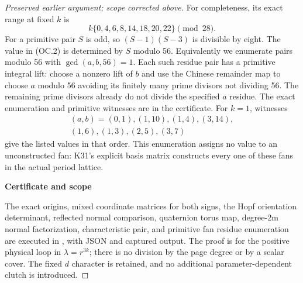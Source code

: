 \begin{proof}[Preserved earlier argument; scope corrected above]
For completeness, its exact range at fixed \(k\) is
\[
       k\{0,4,6,8,14,18,20,22\}\pmod {28}.
 \tag{OC.25}
\]
For a primitive pair \(S\) is odd, so \((S-1)(S-3)\) is divisible by eight.
The value in (OC.2) is determined by \(S\) modulo 56. Equivalently we
enumerate pairs modulo 56 with \(\gcd(a,b,56)=1\). Each such residue pair
has a primitive integral lift: choose a nonzero lift of \(b\) and use
the Chinese remainder map to choose \(a\) modulo 56 avoiding its finitely
many prime divisors not dividing 56. The remaining prime divisors
already do not divide the specified \(a\) residue. The exact enumeration
and primitive witnesses are in the certificate. For \(k=1\), witnesses
\[\begin{gathered}(a,b)=(0,1),(1,10),(1,4),(3,14),\\(1,6),(1,3),(2,5),(3,7)\end{gathered}\] give the
listed values in that order. This enumeration assigns no value to
an unconstructed fan: K31's explicit basis matrix constructs every
one of these fans in the actual period lattice.

\par

\medskip\noindent\textbf{Certificate and scope}

\par\nobreak

The exact origins, mixed coordinate matrices for both signs, the Hopf
orientation determinant, reflected normal comparison, quaternion
torus map, degree-2m normal factorization, characteristic pair, and
primitive fan residue enumeration are executed in
, with JSON and captured output.
The proof is for the positive physical loop in \(\lambda=r^{3k}\);
there is no division by the page degree or by a scalar cover. The
fixed \(d\) character is retained, and no additional parameter-dependent
clutch is introduced.

\end{proof}
